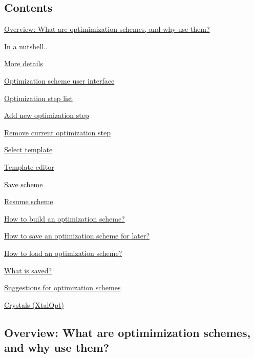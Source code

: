 \hypertarget{optschemes_Contents}{}\subsection{Contents}\label{optschemes_Contents}

\begin{DoxyItemize}
\item \hyperlink{optschemes_overview}{Overview\+: What are optimimization schemes, and why use them?}
\begin{DoxyItemize}
\item \hyperlink{optschemes_quick-over}{In a nutshell..}
\item \hyperlink{optschemes_detailed-over}{More details}
\end{DoxyItemize}
\item \hyperlink{optschemes_gui}{Optimization scheme user interface}
\begin{DoxyItemize}
\item \hyperlink{optschemes_gui-list}{Optimization step list}
\item \hyperlink{optschemes_gui-add}{Add new optimization step}
\item \hyperlink{optschemes_gui-rem}{Remove current optimization step}
\item \hyperlink{optschemes_gui-tselect}{Select template}
\item \hyperlink{optschemes_gui-editor}{Template editor}
\item \hyperlink{optschemes_gui-save}{Save scheme}
\item \hyperlink{optschemes_gui-load}{Resume scheme}
\end{DoxyItemize}
\item \hyperlink{optschemes_creating}{How to build an optimization scheme?}
\item \hyperlink{optschemes_saving}{How to save an optimization scheme for later?}
\item \hyperlink{optschemes_loading}{How to load an optimization scheme?}
\item \hyperlink{optschemes_format}{What is saved?}
\item \hyperlink{optschemes_suggest}{Suggestions for optimization schemes}
\begin{DoxyItemize}
\item \hyperlink{optschemes_sug-xtal}{Crystals (Xtal\+Opt)}
\end{DoxyItemize}
\end{DoxyItemize}\hypertarget{optschemes_overview}{}\subsection{Overview\+: What are optimimization schemes, and why use them?}\label{optschemes_overview}
